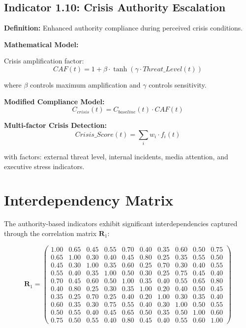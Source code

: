 \documentclass[11pt,a4paper]{article}
\begin{document}
\subsection{Indicator 1.10: Crisis Authority Escalation}

\textbf{Definition:} Enhanced authority compliance during perceived crisis conditions.

\textbf{Mathematical Model:}

Crisis amplification factor:
\begin{equation}
CAF(t) = 1 + \beta \cdot \tanh(\gamma \cdot Threat\_Level(t))
\end{equation}

where $\beta$ controls maximum amplification and $\gamma$ controls sensitivity.

\textbf{Modified Compliance Model:}
\begin{equation}
C_{crisis}(t) = C_{baseline}(t) \cdot CAF(t)
\end{equation}

\textbf{Multi-factor Crisis Detection:}
\begin{equation}
Crisis\_Score(t) = \sum_{i} w_i \cdot f_i(t)
\end{equation}

with factors: external threat level, internal incidents, media attention, and executive stress indicators.

\section{Interdependency Matrix}

The authority-based indicators exhibit significant interdependencies captured through the correlation matrix $\mathbf{R}_{1}$:

\begin{equation}
\mathbf{R}_1 = \begin{pmatrix}
1.00 & 0.65 & 0.45 & 0.55 & 0.70 & 0.40 & 0.35 & 0.60 & 0.50 & 0.75 \\
0.65 & 1.00 & 0.30 & 0.40 & 0.45 & 0.80 & 0.25 & 0.35 & 0.55 & 0.50 \\
0.45 & 0.30 & 1.00 & 0.35 & 0.60 & 0.25 & 0.70 & 0.30 & 0.40 & 0.55 \\
0.55 & 0.40 & 0.35 & 1.00 & 0.50 & 0.30 & 0.25 & 0.75 & 0.45 & 0.40 \\
0.70 & 0.45 & 0.60 & 0.50 & 1.00 & 0.35 & 0.40 & 0.55 & 0.65 & 0.80 \\
0.40 & 0.80 & 0.25 & 0.30 & 0.35 & 1.00 & 0.20 & 0.40 & 0.50 & 0.45 \\
0.35 & 0.25 & 0.70 & 0.25 & 0.40 & 0.20 & 1.00 & 0.30 & 0.35 & 0.40 \\
0.60 & 0.35 & 0.30 & 0.75 & 0.55 & 0.40 & 0.30 & 1.00 & 0.50 & 0.55 \\
0.50 & 0.55 & 0.40 & 0.45 & 0.65 & 0.50 & 0.35 & 0.50 & 1.00 & 0.60 \\
0.75 & 0.50 & 0.55 & 0.40 & 0.80 & 0.45 & 0.40 & 0.55 & 0.60 & 1.00
\end{pmatrix}
\end{equation}
\end{document}
